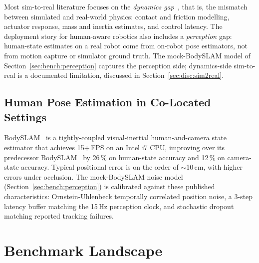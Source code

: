 \documentclass[11pt,a4paper]{report}
\newcommand{\bodyslampp}{BodySLAM\nolinebreak[4]\hspace{-.05em}\raisebox{.2ex}{\scriptsize ++}}
\begin{document}
Most sim-to-real literature focuses on the \emph{dynamics
gap}~\cite{tobin2017domainrand,zhao2020sim2real}, that is, the
mismatch between simulated and real-world physics: contact and
friction modelling, actuator response, mass and inertia estimates,
and control latency. The deployment
story for human-aware robotics also includes a \emph{perception}
gap: human-state estimates on a real robot come from on-robot pose
estimators, not from motion capture or simulator ground truth. The
mock-\bodyslampp{} model of Section~\ref{sec:bench:perception}
captures the perception side; dynamics-side sim-to-real is a
documented limitation, discussed in Section~\ref{sec:disc:sim2real}.

\subsection{Human Pose Estimation in Co-Located Settings}
\label{sec:bg:sim2real:pose}

\bodyslampp{}~\cite{henning2023bodyslampp} is a tightly-coupled
visual-inertial human-and-camera state estimator that achieves
15+\,FPS on an Intel i7 CPU, improving over its predecessor
BodySLAM~\cite{henning2022bodyslam} by 26\,\% on human-state
accuracy and 12\,\% on camera-state accuracy. Typical positional
error is on the order of $\sim$10\,cm, with higher errors under
occlusion. The mock-\bodyslampp{} noise model
(Section~\ref{sec:bench:perception}) is calibrated against these
published characteristics: Ornstein-Uhlenbeck temporally correlated
position noise, a 3-step latency buffer matching the 15\,Hz
perception clock, and stochastic dropout matching reported tracking
failures.

\section{Benchmark Landscape}
\label{sec:bg:bench}
\end{document}
